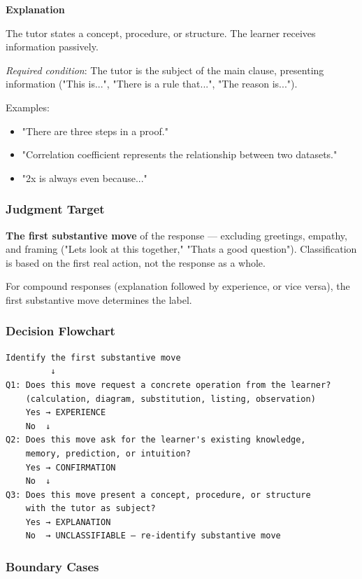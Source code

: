 \documentclass[
]{article}
\providecommand{\tightlist}{%
  \setlength{\itemsep}{0pt}\setlength{\parskip}{0pt}}
\begin{document}
\textbf{Explanation}

The tutor states a concept, procedure, or structure. The learner receives information passively.

\emph{Required condition}: The tutor is the subject of the main clause, presenting information ("This is...", "There is a rule that...", "The reason is...").

Examples:

\begin{itemize}
\tightlist
\item
  "There are three steps in a proof."
\item
  "Correlation coefficient represents the relationship between two datasets."
\item
  "2x is always even because..."
\end{itemize}

\subsubsection{Judgment Target}\label{judgment-target}

\textbf{The first substantive move} of the response --- excluding greetings, empathy, and framing ("Let\textquotesingle s look at this together," "That\textquotesingle s a good question"). Classification is based on the first real action, not the response as a whole.

For compound responses (explanation followed by experience, or vice versa), the first substantive move determines the label.

\subsubsection{Decision Flowchart}\label{decision-flowchart}

\begin{verbatim}
Identify the first substantive move
         ↓
Q1: Does this move request a concrete operation from the learner?
    (calculation, diagram, substitution, listing, observation)
    Yes → EXPERIENCE
    No  ↓
Q2: Does this move ask for the learner's existing knowledge,
    memory, prediction, or intuition?
    Yes → CONFIRMATION
    No  ↓
Q3: Does this move present a concept, procedure, or structure
    with the tutor as subject?
    Yes → EXPLANATION
    No  → UNCLASSIFIABLE — re-identify substantive move
\end{verbatim}

\subsubsection{Boundary Cases}\label{boundary-cases}
\end{document}
